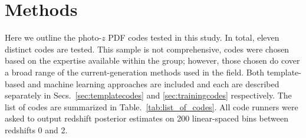 \section{Methods}
\label{sec:pzcodes}

Here we outline the photo-$z$ PDF codes tested in this study. In total, eleven distinct codes are tested.  This sample is not comprehensive, codes were chosen based on the expertise available within the group; however, those chosen do cover a broad range of the current-generation methods used in the field.  Both template-based and machine learning approaches are included and each are described separately in Secs.~\ref{sec:templatecodes} and \ref{sec:trainingcodes} respectively. The list of codes are summarized in Table.~\ref{tab:list_of_codes}.  All code runners were asked to output redshift posterior estimates on 200 linear-spaced bins between redshifts 0 and 2.

